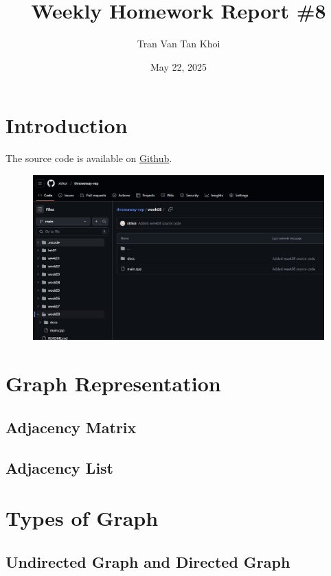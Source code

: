 \documentclass{article}
\author{Tran Van Tan Khoi}
\date{May 22, 2025}
\title{Weekly Homework Report \#8}
\begin{document}
\maketitle

\section{Introduction}
\label{introduction}



The source code is available on \href{https://github.com/xtrkoi/throwaway-rep}{Github}.


\begin{figure}[h]
    \centering
    \includegraphics[width=12cm]{images/github_page.png}
\end{figure}


\section{Graph Representation}
\label{graph_representation}


\subsection{Adjacency Matrix}
\label{adjacency_matrix}

\subsection{Adjacency List}
\label{adjacency_list}

\section{Types of Graph}
\label{types_of_graph}

\subsection{Undirected Graph and Directed Graph}
\label{undirected_directed}
\end{document}
